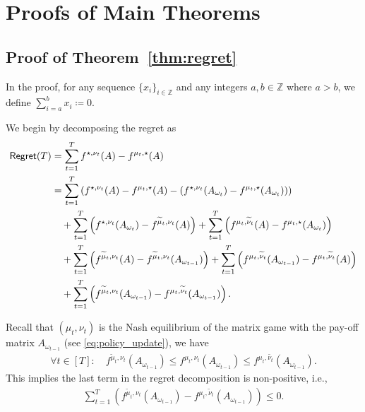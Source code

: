 \section{Proofs of Main Theorems}\label{app:proofs}



\subsection{Proof of Theorem~\ref{thm:regret}}\label{app:proof_regret}
In the proof, for any sequence $\{x_i\}_{i \in \mathbb{Z}}$ and any integers $a,b \in \mathbb{Z}$ where $a > b$, we define $\sum_{i=a}^b x_i \coloneqq 0$.
 
We begin by decomposing the regret as
\begin{align}\label{eq:regret_dec1}
    \mathsf{Regret}(T) &= \sum_{t=1}^T f^{\star,\nu_t}(A) - f^{\mu_t,\star}(A)\notag\\
    &= \sum_{t=1}^T \left( f^{\star,\nu_t}(A) - f^{\mu_t,\star}(A) - \left(f^{\star,\nu_t}(A_{\omega_t}) - f^{\mu_t,\star}(A_{\omega_t}) \right)\right) \notag\\
    &\quad + \sum_{t=1}^T \left(f^{\star,\nu_t}(A_{\omega_t})-f^{\widetilde{\mu}_t,\nu_t}(A)\right) + \sum_{t=1}^T \left(f^{\mu_t,\widetilde{\nu}_t}(A)-f^{\mu_t,\star}(A_{\omega_t})\right)\notag\\
    &\quad + \sum_{t=1}^T \left(f^{\widetilde{\mu}_t,\nu_t}(A)-f^{\widetilde{\mu}_t,\nu_t}(A_{\omega_{t-1}})\right) + \sum_{t=1}^T \left(f^{\mu_t,\widetilde{\nu}_t}(A_{\omega_{t-1}})-f^{\mu_t,\widetilde{\nu}_t}(A)\right)\notag\\
    &\quad + \sum_{t=1}^T \left(f^{\widetilde{\mu}_t,\nu_t}(A_{\omega_{t-1}})-f^{\mu_t,\widetilde{\nu}_t}(A_{\omega_{t-1}})\right).
\end{align}

Recall that $(\mu_t,\nu_t)$ is the Nash equilibrium of the matrix game with the pay-off matrix $A_{\omega_{t-1}}$ (see \eqref{eq:policy_update}), we have
\begin{align}\label{eq:last_term_nash}
    \forall t\in[T]:\quad f^{\widetilde{\mu}_t,\nu_t}(A_{\omega_{t-1}}) \leq f^{\mu_t,\nu_t}(A_{\omega_{t-1}})\leq f^{\mu_t,\widetilde{\nu_t}}(A_{\omega_{t-1}}).
\end{align}
This implies the last term in the regret decomposition is non-positive, i.e.,
\begin{align}\label{eq:last_term_nonpos}
    \sum_{t=1}^T \left(f^{\widetilde{\mu}_t,\nu_t}(A_{\omega_{t-1}})-f^{\mu_t,\widetilde{\nu}_t}(A_{\omega_{t-1}})\right)\leq 0.
\end{align}

